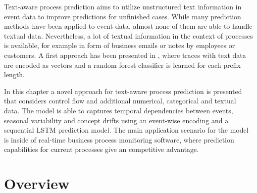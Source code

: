Text-aware process prediction aims to utilize unstructured text information in event data to improve predictions for unfinished cases.
While many prediction methods have been applied to event data, almost none of them are able to handle textual data.
Nevertheless, a lot of textual information in the context of processes is available, for example in form of business emails or notes by employees or customers.
A first approach has been presented in \cite{DBLP:conf/bpm/TeinemaaDMF16}, where traces with text data are encoded as vectors and a random forest classifier is learned for each prefix length.

In this chapter a novel approach for text-aware process prediction is presented that considers control flow and additional numerical, categorical and textual data.
The model is able to captures temporal dependencies between events, seasonal variability and concept drifts using an event-wise encoding and a sequential LSTM prediction model.
The main application scenario for the model is inside of real-time business process monitoring software, where prediction capabilities for current processes give an competitive advantage.

\section{Overview}

